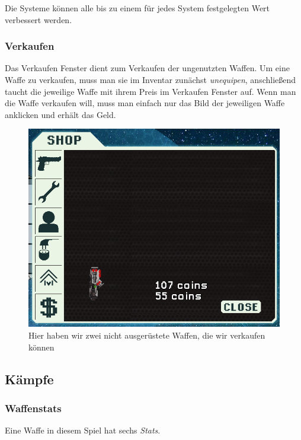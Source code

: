 \documentclass[fontsize=12pt,paper=a4,twoside]{scrartcl}
\begin{document}
Die Systeme können alle bis zu einem für jedes System festgelegten Wert verbessert werden. 

\subsubsection{Verkaufen}

Das Verkaufen Fenster dient zum Verkaufen der ungenutzten Waffen. Um eine Waffe zu verkaufen, muss man sie im Inventar zunächst \textit{unequipen}, anschließend taucht die jeweilige Waffe mit ihrem Preis im Verkaufen Fenster auf. Wenn man die Waffe verkaufen will, muss man einfach nur das Bild der jeweiligen Waffe anklicken und erhält das Geld. 

\begin{figure}[H]
\centering
\includegraphics[width=1\linewidth]{DasSpiel/Shop/sell.png}
\caption{Hier haben wir zwei nicht ausgerüstete Waffen, die wir verkaufen können}
\end{figure}




\subsection{Kämpfe}

\subsubsection{Waffenstats}

Eine Waffe in diesem Spiel hat sechs \textit{Stats}. 
\end{document}
